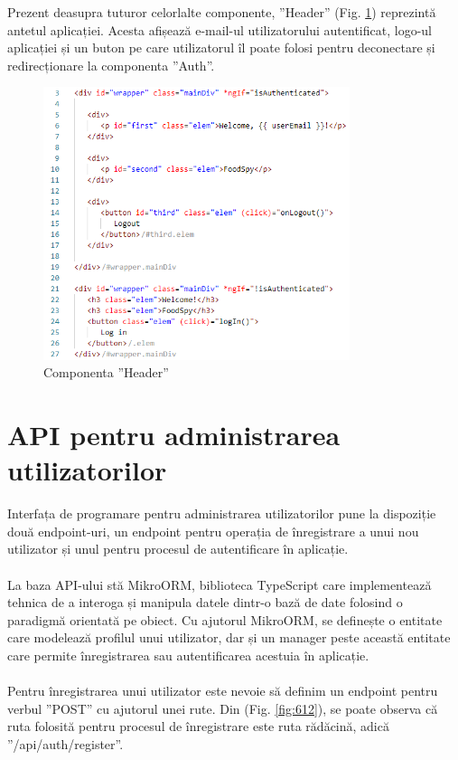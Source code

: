 Prezent deasupra tuturor celorlalte componente, ”Header” (Fig. \ref{fig:611}) reprezintă antetul aplicației. Acesta afișează e-mail-ul utilizatorului autentificat, logo-ul aplicației și un buton pe care utilizatorul îl poate folosi pentru deconectare și redirecționare la componenta ”Auth”.

\begin{figure}[!htb]
	\centering
	\includegraphics[width=0.8\textwidth]
	{../LaTeX/Images/implementare_header.PNG}
	\caption{Componenta ”Header”}
	\label{fig:611}
\end{figure}


\section{API pentru administrarea utilizatorilor}
Interfața de programare pentru administrarea utilizatorilor pune la dispoziție două endpoint-uri, un endpoint pentru operația de înregistrare a unui nou utilizator și unul pentru procesul de autentificare în aplicație.
\\ \\
La baza API-ului stă MikroORM, biblioteca TypeScript care implementează tehnica de a interoga și manipula datele dintr-o bază de date folosind o paradigmă orientată pe obiect. Cu ajutorul MikroORM, se definește o entitate care modelează profilul unui utilizator, dar și un manager peste această entitate care permite înregistrarea sau autentificarea acestuia în aplicație.
\\ \\
Pentru înregistrarea unui utilizator este nevoie să definim un endpoint pentru verbul ”POST” cu ajutorul unei rute. Din (Fig. \ref{fig:612}), se poate observa că ruta folosită pentru procesul de înregistrare este ruta rădăcină, adică ”/api/auth/register”.

